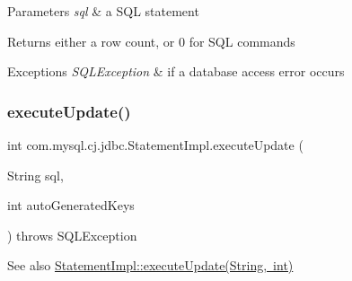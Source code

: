 \begin{DoxyParams}{Parameters}
{\em sql} & a S\+QL statement\\
\hline
\end{DoxyParams}
\begin{DoxyReturn}{Returns}
either a row count, or 0 for S\+QL commands
\end{DoxyReturn}

\begin{DoxyExceptions}{Exceptions}
{\em S\+Q\+L\+Exception} & if a database access error occurs \\
\hline
\end{DoxyExceptions}
\mbox{\label{classcom_1_1mysql_1_1cj_1_1jdbc_1_1_statement_impl_a17446c85d153a1456965eb64858b5f46}} 
\subsubsection{\texorpdfstring{execute\+Update()}{executeUpdate()}\hspace{0.1cm}{\footnotesize\ttfamily [2/4]}}
{\footnotesize\ttfamily int com.\+mysql.\+cj.\+jdbc.\+Statement\+Impl.\+execute\+Update (\begin{DoxyParamCaption}\item[{String}]{sql,  }\item[{int}]{auto\+Generated\+Keys }\end{DoxyParamCaption}) throws S\+Q\+L\+Exception}

\begin{DoxySeeAlso}{See also}
\mbox{\hyperlink{classcom_1_1mysql_1_1cj_1_1jdbc_1_1_statement_impl_a17446c85d153a1456965eb64858b5f46}{Statement\+Impl\+::execute\+Update(\+String, int)}} 
\end{DoxySeeAlso}
\mbox{\label{classcom_1_1mysql_1_1cj_1_1jdbc_1_1_statement_impl_a2ff60b126d55ceb7d991c9d5f56cebb6}} 

